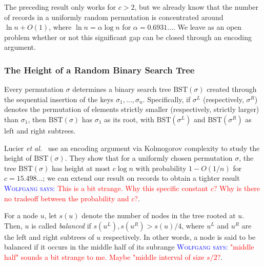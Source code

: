 \documentclass{patmorin}
\newcommand{\aremark}[3]{\textcolor{blue}{\textsc{#1 #2:}}
  \textcolor{red}{\textsf{#3}}}
\newcommand{\wolfgang}[2][says]{\aremark{Wolfgang}{#1}{#2}}
\begin{document}
\begin{rem}
  The preceding result only works for $c > 2$, but we already know
  that the number of records in a uniformly random permutation is
  concentrated around $\ln n + O(1)$, where $\ln n = \alpha \log n$
  for $\alpha = 0.6931...$. We leave as an open problem whether or not
  this significant gap can be closed through an encoding argument.
\end{rem}

\subsubsection{The Height of a Random Binary Search Tree}

Every permutation $\sigma$ determines a binary search tree
$\text{BST}(\sigma)$ created through the sequential insertion of the
keys $\sigma_1, \ldots, \sigma_n$. Specifically, if $\sigma^L$
(respectively, $\sigma^R$) denotes the permutation of elements
strictly smaller (respectively, strictly larger) than $\sigma_1$, then
$\text{BST}(\sigma)$ has $\sigma_1$ as its root, with
$\text{BST}(\sigma^L)$ and $\text{BST}(\sigma^R)$ as left and right
subtrees.

Lucier \emph{et al.}~\cite{lucier.jiang.li:quicksort} use an encoding
argument via Kolmogorov complexity to study the height of
$\text{BST}(\sigma)$. They show that for a uniformly chosen
permutation $\sigma$, the tree $\text{BST}(\sigma)$ has height at most
$c \log n$ with probability $1 - O(1/n)$ for $c = 15.498\dots$; we can
extend our result on records to obtain a tighter result
\wolfgang{This is a bit strange. Why this specific constant $c$? Why
is there no tradeoff between the probability and $c$?}.

For a node $u$, let $s(u)$ denote the number of nodes in the tree
rooted at $u$. Then, $u$ is called \emph{balanced} if $s(u^L), s(u^R)
> s(u)/4$, where $u^L$ and $u^R$ are the left and right subtrees of
$u$ respectively. In other words, a node is said to be balanced if it
occurs in the middle half of its subrange \wolfgang{"middle half" sounds
a bit strange to me. Maybe "middle interval of size $s/2$?}.
\end{document}
